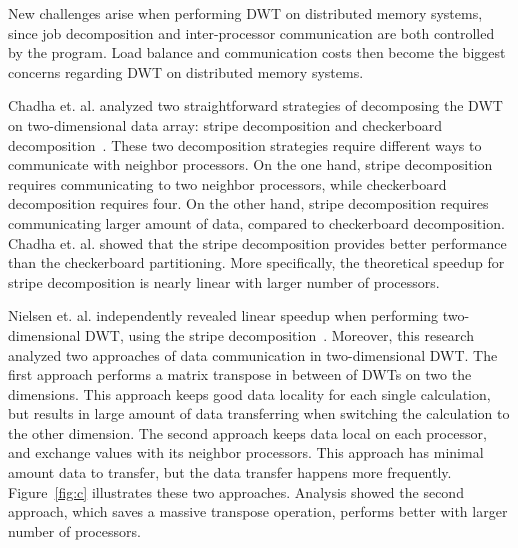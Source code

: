 New challenges arise when performing DWT on distributed memory systems,
since job decomposition and inter-processor communication are both controlled
by the program.
%
Load balance and communication costs then become the biggest concerns 
regarding DWT on distributed memory systems.

Chadha et. al. analyzed two straightforward strategies of decomposing 
the DWT on two-dimensional data array: stripe decomposition and
checkerboard decomposition~\cite{chadha2002scalable}.
%
These two decomposition strategies require different ways to communicate
with neighbor processors.
%
On the one hand, stripe decomposition requires communicating to two 
neighbor processors, while checkerboard decomposition requires four.
%
On the other hand, stripe decomposition requires communicating larger
amount of data, compared to checkerboard decomposition.
%
Chadha et. al. showed that the stripe decomposition provides better
performance than the checkerboard partitioning.
%
More specifically, the theoretical speedup for stripe decomposition 
is nearly linear with larger number of processors.

Nielsen et. al. independently revealed linear speedup when performing 
two-dimensional DWT, using the stripe decomposition~\cite{nielsen1997scalable}.
%
Moreover, this research analyzed two approaches of data communication in
two-dimensional DWT.
%
The first approach performs a matrix transpose in between of DWTs on
two the dimensions. 
%
This approach keeps good data locality for each single calculation, but 
results in large amount of data transferring when switching the calculation
to the other dimension.
%
The second approach keeps data local on each processor, and exchange values
with its neighbor processors.
%
This approach has minimal amount data to transfer, but the data transfer happens 
more frequently.
%
Figure~\ref{fig:c} illustrates these two approaches. 
%
Analysis showed the second approach, which saves a massive transpose operation,
performs better with larger number of processors.

